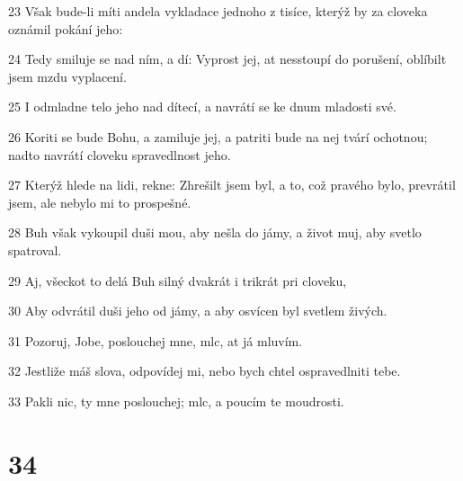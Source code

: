 \par 23 Však bude-li míti andela vykladace jednoho z tisíce, kterýž by za cloveka oznámil pokání jeho:
\par 24 Tedy smiluje se nad ním, a dí: Vyprost jej, at nesstoupí do porušení, oblíbilt jsem mzdu vyplacení.
\par 25 I odmladne telo jeho nad dítecí, a navrátí se ke dnum mladosti své.
\par 26 Koriti se bude Bohu, a zamiluje jej, a patriti bude na nej tvárí ochotnou; nadto navrátí cloveku spravedlnost jeho.
\par 27 Kterýž hlede na lidi, rekne: Zhrešilt jsem byl, a to, což pravého bylo, prevrátil jsem, ale nebylo mi to prospešné.
\par 28 Buh však vykoupil duši mou, aby nešla do jámy, a život muj, aby svetlo spatroval.
\par 29 Aj, všeckot to delá Buh silný dvakrát i trikrát pri cloveku,
\par 30 Aby odvrátil duši jeho od jámy, a aby osvícen byl svetlem živých.
\par 31 Pozoruj, Jobe, poslouchej mne, mlc, at já mluvím.
\par 32 Jestliže máš slova, odpovídej mi, nebo bych chtel ospravedlniti tebe.
\par 33 Pakli nic, ty mne poslouchej; mlc, a poucím te moudrosti.

\chapter{34}

